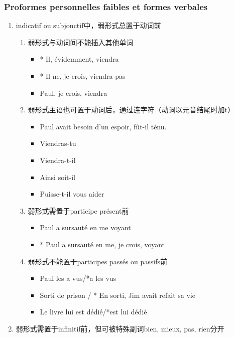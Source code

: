 \documentclass[UTF8]{report}
\begin{document}
\subsubsection{Proformes personnelles faibles et formes verbales}
\begin{enumerate}
    \item indicatif ou subjonctif中，弱形式总置于动词前
    \begin{enumerate}
        \item 弱形式与动词间不能插入其他单词
        \begin{itemize}
            \item * Il, évidemment, viendra
            \item * Il ne, je crois, viendra pas
            \item Paul, je crois, viendra
        \end{itemize}
        \item 弱形式主语也可置于动词后，通过连字符（动词以元音结尾时加t）
        \begin{itemize}
            \item Paul avait besoin d’un espoir, fût-il ténu.
            \item Viendras-tu
            \item Viendra-t-il
            \item Ainsi soit-il
            \item Puisse-t-il vous aider
        \end{itemize}
        \item 弱形式需置于participe présent前
        \begin{itemize}
            \item Paul a sursauté en me voyant
            \item * Paul a sursauté en me, je crois, voyant
        \end{itemize}
        \item 弱形式不能置于participes passés ou passifs前
        \begin{itemize}
            \item Paul les a vus/*a les vus
            \item Sorti de prison / * En sorti, Jim avait refait sa vie
            \item Le livre lui est dédié/*est lui dédié
        \end{itemize}
    \end{enumerate}
    \item 弱形式需置于infinitif前，但可被特殊副词bien, mieux, pas, rien分开

\end{enumerate}
\end{document}
